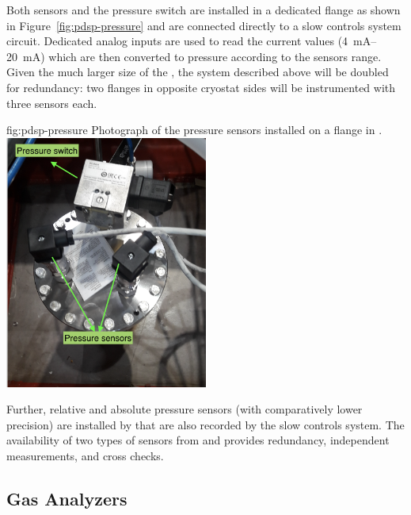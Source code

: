 Both sensors and the pressure switch are installed in a dedicated flange as shown in Figure~\ref{fig:pdsp-pressure} and are connected directly to a slow controls system  circuit. Dedicated analog inputs are used to read the current values (\SIrange{4}{20}{mA}) which are then converted to pressure according to the sensors range. Given the much larger size of the   , the system described above will be doubled for redundancy: two flanges in opposite cryostat sides will be instrumented with three sensors each. 

\begin{dunefigure}{fig:pdsp-pressure}
  {Photograph of the pressure sensors installed on a flange in .}
  \includegraphics[width=0.5\textwidth]{graphics/cisc-pdsp-pressure-meters}
\end{dunefigure}

Further, relative and absolute pressure sensors (with comparatively lower precision) are installed by  that are also recorded by the slow controls system. The availability of two types of sensors from  and  provides redundancy, independent measurements, and cross checks.

\subsection{Gas Analyzers}
\label{sec:fdgen-slow-cryo-gas-anlyz}


